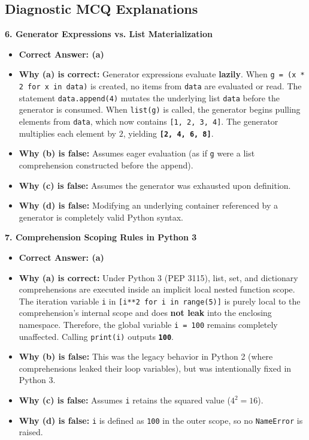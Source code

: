 \subsection*{Diagnostic MCQ Explanations}

\textbf{6. Generator Expressions vs. List Materialization}
\begin{itemize}
    \item \textbf{Correct Answer: (a)}
    \item \textbf{Why (a) is correct:}
    Generator expressions evaluate \textbf{lazily}. When \texttt{g = (x * 2 for x in data)} is created, no items from \texttt{data} are evaluated or read.
    The statement \texttt{data.append(4)} mutates the underlying list \texttt{data} before the generator is consumed.
    When \texttt{list(g)} is called, the generator begins pulling elements from \texttt{data}, which now contains \texttt{[1, 2, 3, 4]}.
    The generator multiplies each element by $2$, yielding \textbf{\texttt{[2, 4, 6, 8]}}.
    \item \textbf{Why (b) is false:} Assumes eager evaluation (as if \texttt{g} were a list comprehension constructed before the append).
    \item \textbf{Why (c) is false:} Assumes the generator was exhausted upon definition.
    \item \textbf{Why (d) is false:} Modifying an underlying container referenced by a generator is completely valid Python syntax.
\end{itemize}

\textbf{7. Comprehension Scoping Rules in Python 3}
\begin{itemize}
    \item \textbf{Correct Answer: (a)}
    \item \textbf{Why (a) is correct:}
    Under Python 3 (PEP 3115), list, set, and dictionary comprehensions are executed inside an implicit local nested function scope. The iteration variable \texttt{i} in \texttt{[i**2 for i in range(5)]} is purely local to the comprehension's internal scope and does \textbf{not leak} into the enclosing namespace.
    Therefore, the global variable \texttt{i = 100} remains completely unaffected.
    Calling \texttt{print(i)} outputs \textbf{\texttt{100}}.
    \item \textbf{Why (b) is false:} This was the legacy behavior in Python 2 (where comprehensions leaked their loop variables), but was intentionally fixed in Python 3.
    \item \textbf{Why (c) is false:} Assumes \texttt{i} retains the squared value ($4^2 = 16$).
    \item \textbf{Why (d) is false:} \texttt{i} is defined as \texttt{100} in the outer scope, so no \texttt{NameError} is raised.
\end{itemize}


